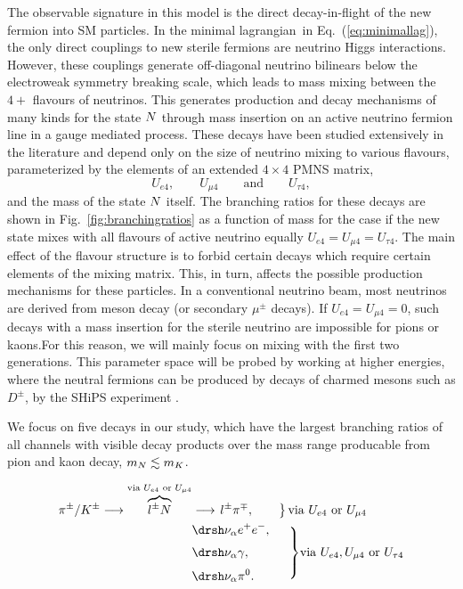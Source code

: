\documentclass[11pt, a4paper]{article}
\newcommand{\refeq}[1]{Eq.~(\ref{#1})}
\newcommand{\reffig}[1]{Fig.~\ref{#1}}
\def\lagrangian{lagrangian}
\def\ster{\ensuremath N}
\begin{document}
The observable signature in this model is the direct decay-in-flight of the new
fermion into SM particles. In the minimal \lagrangian\ in
\refeq{eq:minimallag}, the only direct couplings to new sterile fermions are
neutrino Higgs interactions. However, these couplings generate off-diagonal
neutrino bilinears below the electroweak symmetry breaking scale, which leads
to mass mixing between the $4+$ flavours of neutrinos. This generates
production and decay mechanisms of many kinds for the state $\ster$ through
mass insertion on an active neutrino fermion line in a gauge mediated process.
These decays have been studied extensively in the literature \cite{Atre:2009rg}
and depend only on the size of neutrino mixing to various flavours,
parameterized by the elements of an extended $4\times4$ PMNS matrix,
%
\[ U_{e4}, \qquad U_{\mu 4} \qquad \text{and} \qquad U_{\tau 4},  \]
%
and the mass of the state $\ster$ itself. The branching ratios for these decays
are shown in \reffig{fig:branchingratios} as a function of mass for the case if
the new state mixes with all flavours of active neutrino equally $U_{e4}=U_{\mu
4}=U_{\tau 4}$. The main effect of the flavour structure is to forbid certain
decays which require certain elements of the mixing matrix. This, in turn,
affects the possible production mechanisms for these particles. In a
conventional neutrino beam, most neutrinos are derived from meson decay (or
secondary $\mu^\pm$ decays). If $U_{e4}=U_{\mu 4}=0$, such decays with a mass
insertion for the sterile neutrino are impossible for pions or kaons.For this
reason, we will mainly focus on mixing with the first two generations. This
parameter space will be probed by working at higher energies, where the neutral
fermions can be produced by decays of charmed mesons such as $D^\pm$, by the
SHiPS experiment \cite{Alekhin:2015byh, Anelli:2015pba}.   

We focus on five decays in our study, which have the largest branching ratios
of all channels with visible decay products over the mass range producable from
pion and kaon decay, $m_{\ster} \lesssim m_K$.

\begin{align*}
\pi^\pm / K^\pm \longrightarrow \overbrace{l^\pm \ster}^{\text{via } U_{e4} \text{ or } U_{\mu 4}}  &\longrightarrow \left. l^\pm \pi^\mp, \qquad \right\} \text{via } U_{e4} \text{ or } U_{\mu 4}\\
														    & \drsh \nu_\alpha e^+ e^-,\\[\jot]
					   & \drsh \nu_\alpha \gamma, \hspace*{3em}
		\smash{\left.\begin{array}{@{}c@{}}\\[\jot]\\[\jot]\\[\jot]\end{array}\right\}}\text{via } U_{e4}, U_{\mu 4} \text{  or  } U_{\tau 4}\\[\jot]
						& \drsh \nu_\alpha \pi^0.
\end{align*}
\end{document}
